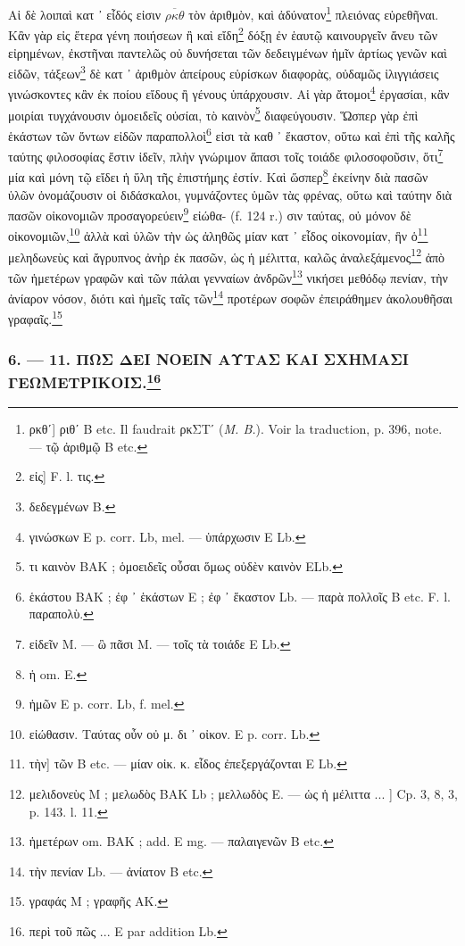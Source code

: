 \documentclass[a4paper, 11pt, oneside, polutonikogreek, french]{article}
\begin{document}
Αἱ δὲ λοιπαὶ κατ ᾽ εἶδός εἰσιν $\overline{\rho\kappa\theta}$ τὸν ἀριθμὸν, καὶ ἀδύνατον\footnote{ρκθʹ] ριθʹ B etc. Il faudrait ρκΣΤʹ (\emph{M. B.}). Voir la traduction, p. 396, note. --- τῷ ἀριθμῷ B etc.} πλειόνας εὑρεθῆναι. Κἂν γὰρ εἰς ἕτερα γένη ποιήσεων ἢ καὶ εἴδη\footnote{εἰς] F. l. τις.} δόξῃ ἐν ἑαυτῷ καινουργεῖν ἄνευ τῶν εἰρημένων, ἐκστῆναι παντελῶς οὐ δυνήσεται τῶν δεδειγμένων ἡμῖν ἀρτίως γενῶν καὶ εἰδῶν, τάξεων\footnote{δεδεγμένων B.} δὲ κατ ᾽ ἀριθμὸν ἀπείρους εὑρίσκων διαφορὰς, οὐδαμῶς ἰλιγγιάσεις γινώσκοντες κἂν ἐκ ποίου εἴδους ἢ γένους ὑπάρχουσιν. Αἱ γὰρ ἄτομοι\footnote{γινώσκων E p. corr. Lb, mel. --- ὑπάρχωσιν E Lb.} ἐργασίαι, κἂν μοιρίαι τυγχάνουσιν ὁμοειδεῖς οὐσίαι, τὸ καινὸν\footnote{τι καινὸν BAK ; ὁμοειδεῖς οὖσαι ὅμως οὐδὲν καινὸν ELb.} διαφεύγουσιν. Ὥσπερ γὰρ ἐπὶ ἑκάστων τῶν ὄντων εἰδῶν παραπολλοὶ\footnote{ἑκάστου BAK ; ἐφ ᾽ ἑκάστων E ; ἐφ ᾽ ἕκαστον Lb. --- παρὰ πολλοῖς B etc. F. l. παραπολὺ.} εἰσι τὰ καθ ᾽ ἕκαστον, οὕτω καὶ ἐπὶ τῆς καλῆς ταύτης φιλοσοφίας ἔστιν ἰδεῖν, πλὴν γνώριμον ἅπασι τοῖς τοιάδε φιλοσοφοῦσιν, ὅτι\footnote{εἰδεῖν M. --- ὣ πᾶσι M. --- τοῖς τὰ τοιάδε E Lb.} μία καὶ μόνη τῷ εἴδει ἡ ὕλη τῆς ἐπιστήμης ἐστίν. Καὶ ὥσπερ\footnote{ἡ om. E.} ἐκείνην διὰ πασῶν ὑλῶν ὁνομάζουσιν οἱ διδάσκαλοι, γυμνάζοντες ὑμῶν τὰς φρένας, οὕτω καὶ ταύτην διὰ πασῶν οἰκονομιῶν προσαγορεύειν\footnote{ἡμῶν E p. corr. Lb, f. mel.} εἰώθα- (f. 124 r.) σιν ταύτας, οὐ μόνον δὲ οἰκονομιῶν,\footnote{εἰώθασιν. Ταύτας οὖν οὐ μ. δι ᾽ οἰκον. E p. corr. Lb.} ἀλλὰ καὶ ὑλῶν τὴν ὡς ἀληθῶς μίαν κατ ᾽ εἶδος οἰκονομίαν, ἣν ὁ\footnote{τὴν] τῶν B etc. --- μίαν οἰκ. κ. εἶδος ἐπεξεργάζονται E Lb.} μεληδωνεὺς καὶ ἄγρυπνος ἀνὴρ ἐκ πασῶν, ὡς ἡ μέλιττα, καλῶς ἀναλεξάμενος\footnote{μελιδονεὺς M ; μελωδὸς BAK Lb ; μελλωδὸς E. --- ὡς ἡ μέλιττα ... ] Cp. 3, 8, 3, p. 143. l. 11.} ἀπὸ τῶν ἡμετέρων γραφῶν καὶ τῶν πάλαι γενναίων ἀνδρῶν\footnote{ἡμετέρων om. BAK ; add. E mg. --- παλαιγενῶν B etc.} νικήσει μεθόδῳ πενίαν, τὴν ἀνίαρον νόσον, διότι καὶ ἡμεῖς ταῖς τῶν\footnote{τὴν πενίαν Lb. --- ἀνίατον B etc.} προτέρων σοφῶν ἐπειράθημεν ἀκολουθῆσαι γραφαῖς.\footnote{γραφάς M ; γραφῆς AK.}

\clearpage
\bigskip
\centerline{\EightStarTaper}
\centerline{\EightStarTaper\EightStarTaper}
\bigskip

\subsubsection[6. --- 11. ΠΩΣ ΔΕΙ ΝΟΕΙΝ ΑΥΤΑΣ ΚΑΙ ΣΧΗΜΑΣΙ ΓΕΩΜΕΤΡΙΚΟΙΣ.]{6. --- 11. ΠΩΣ ΔΕΙ ΝΟΕΙΝ ΑΥΤΑΣ ΚΑΙ ΣΧΗΜΑΣΙ ΓΕΩΜΕΤΡΙΚΟΙΣ.\footnote{περὶ τοῦ πῶς ... E par addition Lb.}}
\end{document}

